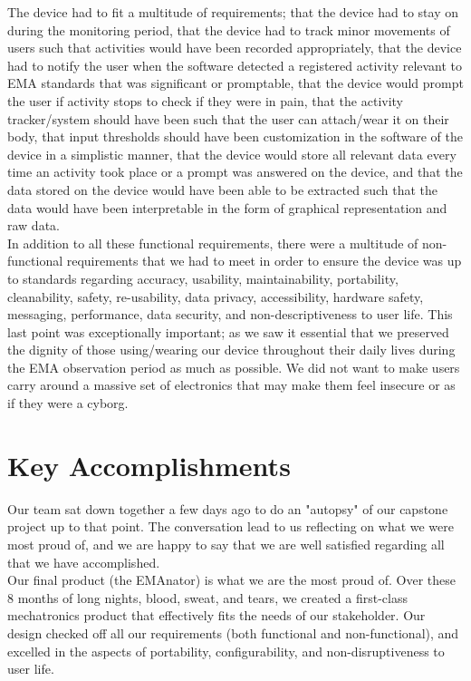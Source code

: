 \documentclass{article}
\begin{document}
The device had to fit a multitude of requirements; that the device had to stay on during the monitoring period, that the device had to track minor movements of users such that activities would have been recorded appropriately, that the device had to notify the user when the software detected a registered activity relevant to EMA standards that was significant or promptable, that the device would prompt the user if activity stops to check if they were in pain, that the activity tracker/system should have been such that the user can attach/wear it on their body, that input thresholds should have been customization in the software of the device in a simplistic manner, that the device would store all relevant data every time an activity took place or a prompt was answered on the device, and that the data stored on the device would have been able to be extracted such that the data would have been interpretable in the form of graphical representation and raw data.\\

In addition to all these functional requirements, there were a multitude of non-functional requirements that we had to meet in order to ensure the device was up to standards regarding accuracy, usability, maintainability, portability, cleanability, safety, re-usability, data privacy, accessibility, hardware safety, messaging, performance, data security, and non-descriptiveness to user life. This last point was exceptionally important; as we saw it essential that we preserved the dignity of those using/wearing our device throughout their daily lives during the EMA observation period as much as possible. We did not want to make users carry around a massive set of electronics that may make them feel insecure or as if they were a cyborg.\\

\section{Key Accomplishments}

Our team sat down together a few days ago to do an "autopsy" of our capstone project up to that point. The conversation lead to us reflecting on what we were most proud of, and we are happy to say that we are well satisfied regarding all that we have accomplished.\\

Our final product (the EMAnator) is what we are the most proud of. Over these 8 months of long nights, blood, sweat, and tears, we created a first-class mechatronics product that effectively fits the needs of our stakeholder. Our design checked off all our requirements (both functional and non-functional), and excelled in the aspects of portability, configurability, and non-disruptiveness to user life.\\
\end{document}
